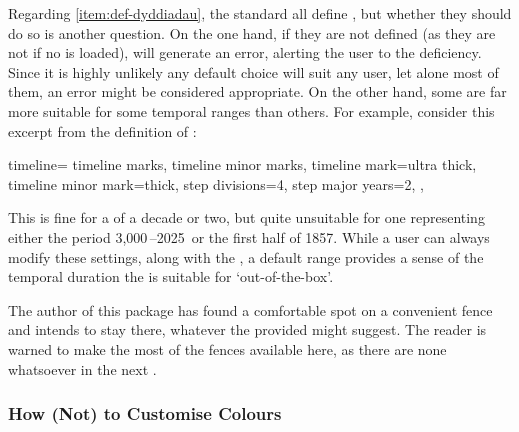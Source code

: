\documentclass[10pt,british,a4paper]{ltxdoc}
\newcommand*\pkg[1]{\textpkg{#1}}
\begin{document}
Regarding \cref{item:def-dyddiadau}, the standard \chronosstyleslabelname{} all define , but whether they should do so is another question.
On the one hand, if they are not defined (as they are not if no \chronosstylelabelname{} is loaded), \pkg{chronos} will generate an error, alerting the user to the deficiency.
Since it is highly unlikely any default choice will suit any user, let alone most of them, an error might be considered appropriate.
On the other hand, some \chronosstyleslabelname{} are far more suitable for some temporal ranges than others.
For example, consider this excerpt from the definition of :
\begin{chronoscode}
  timeline={%
    timeline marks,
    timeline minor marks,
    timeline mark={ultra thick},
    timeline minor mark={thick},
    step divisions=4,
    step major years=2,
  },
\end{chronoscode}
This is fine for a  of a decade or two, but quite unsuitable for one representing either the period 3,000\,\bce{}--2025\,\ce{} or the first half of 1857.
While a user can always modify these settings, along with the , a default range provides a sense of the temporal duration the \chronosstylelabelname{} is suitable for ‘out-of-the-box’.

The author of this package has found a comfortable spot on a convenient fence and intends to stay there, whatever the provided \chronosstyleslabelname{} might suggest.
The reader is warned to make the most of the fences available here, as there are none whatsoever in the next .

\subsubsection{How (Not) to Customise Colours}\label{subsubsec:custom-styles-colours}
\end{document}
